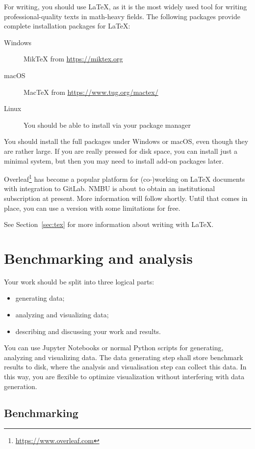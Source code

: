 \documentclass[sigconf, nonacm, natbib, screen, balance=False]{acmart}
\begin{document}
For writing, you should use \LaTeX, as it is the most widely used tool
for writing professional-quality texts in math-heavy fields. The
following packages provide complete installation packages for
\LaTeX:

\begin{description}
\item[Windows] MikTeX from \url{https://miktex.org}
\item[macOS] MacTeX from \url{https://www.tug.org/mactex/}
\item[Linux] You should be able to install via your package manager
\end{description}
  
You should install the full packages under Windows or macOS,
even though they are rather large. If you are really pressed for disk
space, you can install just a minimal system, but then you may need to
install add-on packages later.

Overleaf\footnote{\url{https://www.overleaf.com}} has become a popular
platform for (co-)working on \LaTeX{} documents with integration to
GitLab. NMBU is about to obtain an institutional subscription at
present. More information will follow shortly. Until that comes in
place, you can use a version with some limitations for free.

See Section~\ref{sec:tex} for more information about writing with
\LaTeX.


\section{Benchmarking and analysis}\label{sec:benchanalyze}

Your work should be split into three logical parts:
\begin{itemize}
\item generating data;
\item analyzing and visualizing data;
\item describing and discussing your work and results.
\end{itemize}

You can use Jupyter Notebooks or normal Python scripts for generating,
analyzing and visualizing data.  The data generating step shall store
benchmark results to disk, where the analysis and visualisation step
can collect this data. In this way, you are flexible to optimize
visualization without interfering with data generation.

\subsection{Benchmarking}\label{sec:bench}
\end{document}
